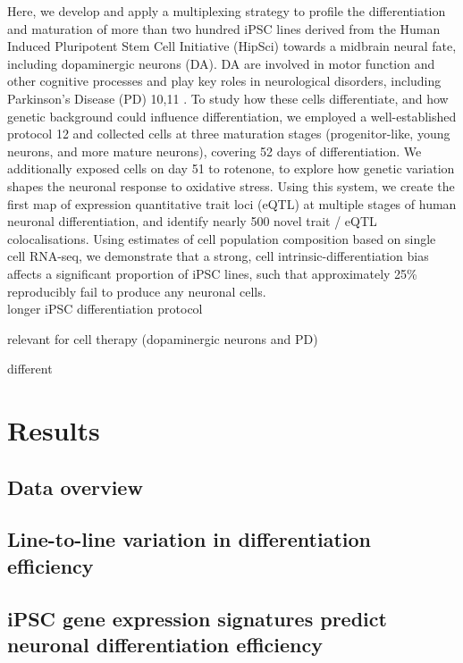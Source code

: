 Here, we develop and apply a multiplexing strategy to profile the differentiation and maturation of more than two hundred iPSC lines derived from the Human Induced Pluripotent Stem Cell Initiative (HipSci) towards a midbrain neural fate, including dopaminergic neurons (DA). 
DA are involved in motor function and other cognitive processes and play key roles in neurological disorders, including Parkinson’s Disease (PD) 10,11 \cite{osborn2017seq, stoddard2020stem}. 
To study how these cells differentiate, and how genetic background could influence differentiation, we employed a well-established protocol 12 and collected cells at three maturation stages (progenitor-like, young neurons, and more mature neurons), covering 52 days of differentiation. 
We additionally exposed cells on day 51 to rotenone, to explore how genetic variation shapes the neuronal response to oxidative stress. 
Using this system, we create the first map of expression quantitative trait loci (eQTL) at multiple stages of human neuronal differentiation, and identify nearly 500 novel trait / eQTL colocalisations. 
Using estimates of cell population composition based on single cell RNA-seq, we demonstrate that a strong, cell intrinsic-differentiation bias affects a significant proportion of iPSC lines, such that approximately 25\% reproducibly fail to produce any neuronal cells.\\

longer iPSC differentiation protocol

relevant for cell therapy (dopaminergic neurons and PD)

different 

\section{Results}

\subsection{Data overview}

\subsection{Line-to-line variation in differentiation efficiency}

\subsection{iPSC gene expression signatures predict neuronal differentiation efficiency}

